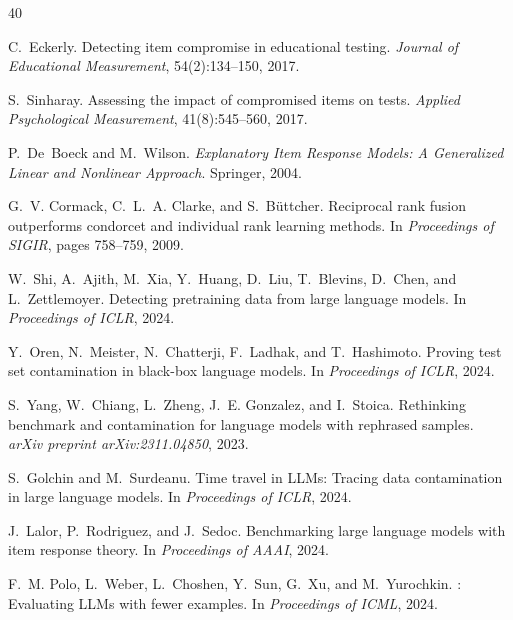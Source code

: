 \documentclass[11pt,a4paper]{article}
\begin{document}
\begin{thebibliography}{40}

C.~Eckerly.
\newblock Detecting item compromise in educational testing.
\newblock \emph{Journal of Educational Measurement}, 54(2):134--150, 2017.

S.~Sinharay.
\newblock Assessing the impact of compromised items on tests.
\newblock \emph{Applied Psychological Measurement}, 41(8):545--560, 2017.

P.~De~Boeck and M.~Wilson.
\newblock \emph{Explanatory Item Response Models: A Generalized Linear and Nonlinear Approach}.
\newblock Springer, 2004.

G.~V. Cormack, C.~L.~A. Clarke, and S.~B{\"u}ttcher.
\newblock Reciprocal rank fusion outperforms condorcet and individual rank learning methods.
\newblock In \emph{Proceedings of SIGIR}, pages 758--759, 2009.

W.~Shi, A.~Ajith, M.~Xia, Y.~Huang, D.~Liu, T.~Blevins, D.~Chen, and L.~Zettlemoyer.
\newblock Detecting pretraining data from large language models.
\newblock In \emph{Proceedings of ICLR}, 2024.

Y.~Oren, N.~Meister, N.~Chatterji, F.~Ladhak, and T.~Hashimoto.
\newblock Proving test set contamination in black-box language models.
\newblock In \emph{Proceedings of ICLR}, 2024.

S.~Yang, W.~Chiang, L.~Zheng, J.~E. Gonzalez, and I.~Stoica.
\newblock Rethinking benchmark and contamination for language models with rephrased samples.
\newblock \emph{arXiv preprint arXiv:2311.04850}, 2023.

S.~Golchin and M.~Surdeanu.
\newblock Time travel in {LLMs}: Tracing data contamination in large language models.
\newblock In \emph{Proceedings of ICLR}, 2024.

J.~Lalor, P.~Rodriguez, and J.~Sedoc.
\newblock Benchmarking large language models with item response theory.
\newblock In \emph{Proceedings of AAAI}, 2024.

F.~M. Polo, L.~Weber, L.~Choshen, Y.~Sun, G.~Xu, and M.~Yurochkin.
: Evaluating {LLMs} with fewer examples.
\newblock In \emph{Proceedings of ICML}, 2024.


\end{thebibliography}
\end{document}
